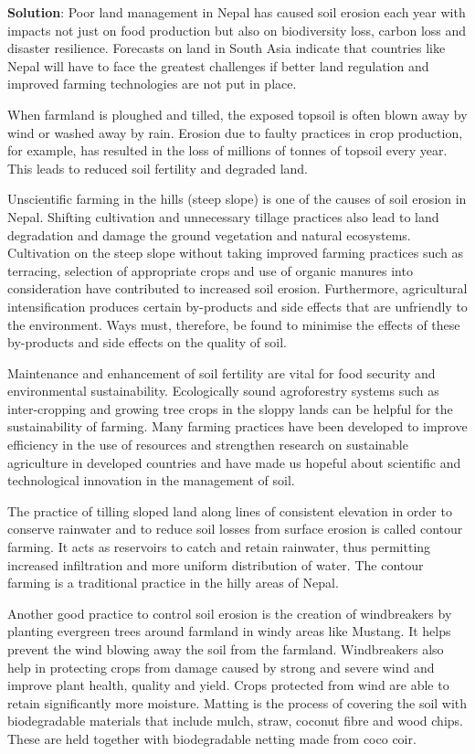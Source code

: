 \documentclass[
]{book}
\newenvironment{solution}{ {\bfseries Solution}:}{}
\begin{document}
\begin{questions}
\begin{solution}
Poor land management in Nepal has caused soil erosion each year with impacts not just on food production but also on biodiversity loss, carbon loss and disaster resilience. Forecasts on land in South Asia indicate that countries like Nepal will have to face the greatest challenges if better land regulation and improved farming technologies are not put in place.

When farmland is ploughed and tilled, the exposed topsoil is often blown away by wind or washed away by rain. Erosion due to faulty practices in crop production, for example, has resulted in the loss of millions of tonnes of topsoil every year. This leads to reduced soil fertility and degraded land.

Unscientific farming in the hills (steep slope) is one of the causes of soil erosion in Nepal. Shifting cultivation and unnecessary tillage practices also lead to land degradation and damage the ground vegetation and natural ecosystems. Cultivation on the steep slope without taking improved farming practices such as terracing, selection of appropriate crops and use of organic manures into consideration have contributed to increased soil erosion. Furthermore, agricultural intensification produces certain by-products and side effects that are unfriendly to the environment. Ways must, therefore, be found to minimise the effects of these by-products and side effects on the quality of soil.

Maintenance and enhancement of soil fertility are vital for food security and environmental sustainability. Ecologically sound agroforestry systems such as inter-cropping and growing tree crops in the sloppy lands can be helpful for the sustainability of farming. Many farming practices have been developed to improve efficiency in the use of resources and strengthen research on sustainable agriculture in developed countries and have made us hopeful about scientific and technological innovation in the management of soil.

The practice of tilling sloped land along lines of consistent elevation in order to conserve rainwater and to reduce soil losses from surface erosion is called contour farming. It acts as reservoirs to catch and retain rainwater, thus permitting increased infiltration and more uniform distribution of water. The contour farming is a traditional practice in the hilly areas of Nepal.

Another good practice to control soil erosion is the creation of windbreakers by planting evergreen trees around farmland in windy areas like Mustang. It helps prevent the wind blowing away the soil from the farmland. Windbreakers also help in protecting crops from damage caused by strong and severe wind and improve plant health, quality and yield. Crops protected from wind are able to retain significantly more moisture. Matting is the process of covering the soil with biodegradable materials that include mulch, straw, coconut fibre and wood chips. These are held together with biodegradable netting made from coco coir.


\end{solution}
\end{questions}
\end{document}
